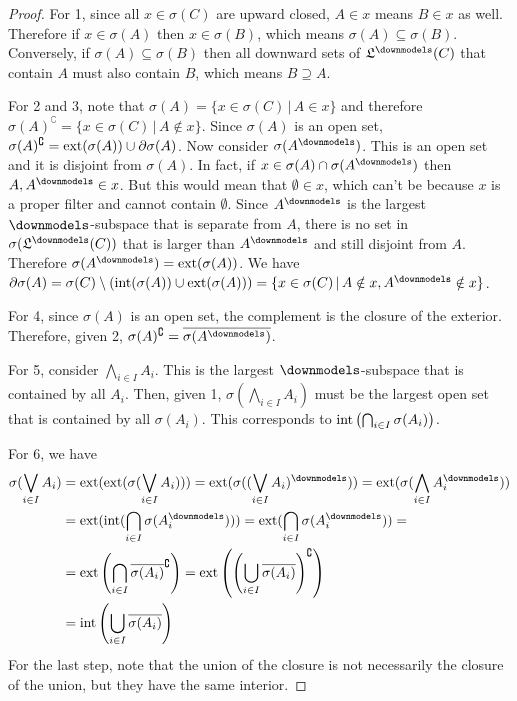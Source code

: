 	\begin{proof}
		For 1, since all $x \in \sigma(C)$ are upward closed, $A \in x$ means $B \in x$ as well. Therefore if $x \in \sigma(A)$ then $x \in \sigma(B)$, which means $\sigma(A) \subseteq \sigma(B)$. Conversely, if $\sigma(A) \subseteq \sigma(B)$ then all downward sets of $\mathfrak{L}^\separate(C)$ that contain $A$ must also contain $B$, which means $B \supseteq A$.
		
		For 2 and 3, note that $\sigma(A) = \{ x \in \sigma(C) \, | \, A \in x \}$ and therefore $\sigma(A)^{\complement} = \{ x \in \sigma(C) \, | \, A \notin x \}$. Since $\sigma(A)$ is an open set, $\sigma(A)^{\complement} = \operatorname{ext}(\sigma(A)) \cup \partial \sigma(A)$. Now consider $\sigma(A^{\separate})$. This is an open set and it is disjoint from $\sigma(A)$. In fact, if $x \in \sigma(A) \cap \sigma(A^{\separate})$ then $A, A^{\separate} \in x$. But this would mean that $\emptyset \in x$, which can't be because $x$ is a proper filter and cannot contain $\emptyset$. Since $A^{\separate}$ is the largest $\separate$-subspace that is separate from $A$, there is no set in $\sigma(\mathfrak{L}^\separate(C))$ that is larger than $A^{\separate}$ and still disjoint from $A$. Therefore $\sigma(A^{\separate}) = \exterior(\sigma(A))$. We have $\partial \sigma(A) = \sigma(C) \setminus (\interior(\sigma(A))\cup\exterior(\sigma(A))) = \{ x \in \sigma(C) \, | \, A \notin x, A^{\separate} \notin x \}$.
		
		For 4, since $\sigma(A)$ is an open set, the complement is the closure of the exterior. Therefore, given 2, $\sigma(A)^{\complement} = \overline{\sigma(A^{\separate})}$.
		
		For 5, consider $\bigwedge_{i \in I} A_i$. This is the largest $\separate$-subspace that is contained by all $A_i$. Then, given 1, $\sigma\left(\bigwedge_{i \in I} A_i\right)$ must be the largest open set that is contained by all $\sigma(A_i)$. This corresponds to $\operatorname{int}\left(\bigcap_{i \in I} \sigma(A_i)\right)$.
		
		For 6, we have
		\begin{align*}
			\sigma(\bigvee_{i \in I} A_i) &= \exterior(\exterior(\sigma(\bigvee_{i \in I} A_i))) = \exterior(\sigma((\bigvee_{i \in I} A_i)^{\separate})) = \exterior(\sigma(\bigwedge_{i \in I} A_i^{\separate})) \\
			&= \exterior(\interior(\bigcap_{i \in I} \sigma(A_i^{\separate}))) = \exterior(\bigcap_{i \in I} \sigma(A_i^{\separate})) =  \\
			&= \exterior\left(\bigcap_{i \in I}\overline{\sigma(A_i)}^{\complement}\right) = \exterior\left(\left(\bigcup_{i \in I}\overline{\sigma(A_i)}\right)^{\complement}\right) \\
			&= \interior\left(\bigcup_{i \in I}\overline{\sigma(A_i)}\right)
		\end{align*}
		For the last step, note that the union of the closure is not necessarily the closure of the union, but they have the same interior.
		

\end{proof}
